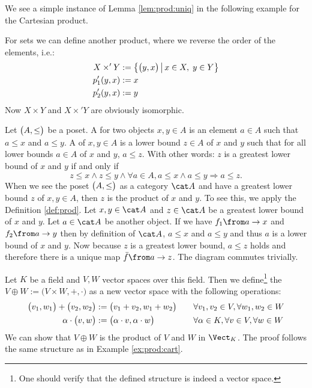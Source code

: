 We see a simple instance of Lemma \ref{lem:prod:uniq} in the following example for the Cartesian product.

\begin{example}
  \label{ex:prod:cart2}
  For sets we can define another product, where we reverse the order of the elements, i.e.:
  \begin{alignat*}{2}
    X \times' Y &:= \bigl \{ \bigl( y , x \bigr) \,\big|\, x \in X, \; y \in Y \bigr \} \\
    p'_1(y,x)   &:= x \\
    p'_2(y,x)   &:= y
  \end{alignat*}
  Now $X \times Y$ and $X \times' Y$ are obviously isomorphic.
\end{example}

\begin{example}[Posets]
  \label{ex:prod:poset}
  Let $\bigl( A , \le \bigr)$ be a poset.
  A  for two objects $x, y \in A$ is an element $a \in A$ such that $a \le x$ and $a \le y$.
  A  of $x, y \in A$ is a lower bound $z \in A$ of $x$ and $y$ such that for all lower bounds $a \in A$ of $x$ and $y$, $a \le z$.
  With other words: $z$ is a greatest lower bound of $x$ and $y$ if and only if
  $$z \le x \land z \le y \land \forall a \in A, a \le x \land a \le y \Rightarrow a \le z.$$
  When we see the poset $\bigl( A , \le \bigr)$ as a category $\catA$ and have a greatest lower bound $z$ of $x, y \in A$, then $z$ is the product of $x$ and $y$.
  To see this, we apply the Definition \ref{def:prod}.
  Let $x, y \in \catA$ and $z \in \catA$ be a greatest lower bound of $x$ and $y$.
  Let $a \in \catA$ be another object.
  If we have $f_1 \from a \to x$ and $f_2 \from a \to y$ then by definition of $\catA$, $a \le x$ and $a \le y$ and thus $a$ is a lower bound of $x$ and $y$.
  Now because $z$ is a greatest lower bound, $a \le z$ holds and therefore there is a unique map $\fbar \from a \to z$.
  The diagram commutes trivially.
\end{example}

\begin{example}
  \label{ex:prod:vspace}
  Let $K$ be a field and $V, W$ vector spaces over this field.
  Then we define\footnote{One should verify that the defined structure is indeed a vector space.}
  the  $V \oplus W := \bigl(V \times W, +, \cdot \bigr)$ as a new vector space with the following operations:
  \begin{alignat*}{4}
    \bigl( v_1 , w_1 \bigr) + \bigl( v_2 , w_2 \bigr) &:= \bigl( v_1 + v_2 , w_1 + w_2 \bigr)           &\quad& \forall v_1, v_2 \in V, \forall w_1, w_2 \in W \\
    \alpha \cdot \bigl( v , w \bigr)          &:= \bigl( \alpha \cdot v , \alpha \cdot w \bigr) &     & \forall \alpha \in K, \forall v \in V, \forall w \in W
  \end{alignat*}
  We can show that $V \oplus W$ is the product of $V$ and $W$ in $\Vect_K$.
  The proof follows the same structure as in Example \ref{ex:prod:cart}.
\end{example}

